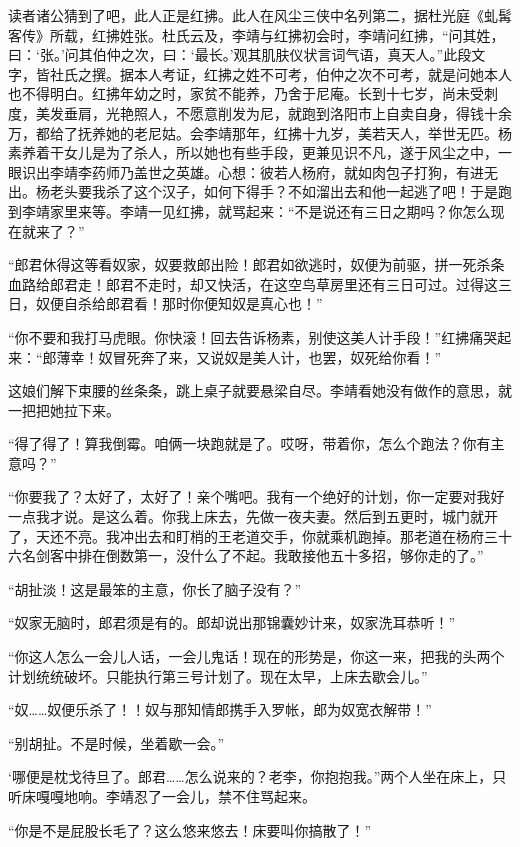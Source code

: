 读者诸公猜到了吧，此人正是红拂。此人在风尘三侠中名列第二，据杜光庭《虬髯客传》所载，红拂姓张。杜氏云及，李靖与红拂初会时，李靖问红拂，“问其姓，曰：‘张。’问其伯仲之次，曰：‘最长。’观其肌肤仪状言词气语，真天人。”此段文字，皆社氏之撰。据本人考证，红拂之姓不可考，伯仲之次不可考，就是问她本人也不得明白。红拂年幼之时，家贫不能养，乃舍于尼庵。长到十七岁，尚未受刺度，美发垂肩，光艳照人，不愿意削发为尼，就跑到洛阳市上自卖自身，得钱十余万，都给了抚养她的老尼姑。会李靖那年，红拂十九岁，美若天人，举世无匹。杨素养着干女儿是为了杀人，所以她也有些手段，更兼见识不凡，遂于风尘之中，一眼识出李靖李药师乃盖世之英雄。心想：彼若人杨府，就如肉包子打狗，有进无出。杨老头要我杀了这个汉子，如何下得手？不如溜出去和他一起逃了吧！于是跑到李靖家里来等。李靖一见红拂，就骂起来：“不是说还有三日之期吗？你怎么现在就来了？”

“郎君休得这等看奴家，奴要救郎出险！郎君如欲逃时，奴便为前驱，拼一死杀条血路给郎君走！郎君不走时，却又快活，在这空鸟草房里还有三日可过。过得这三日，奴便自杀给郎君看！那时你便知奴是真心也！”

“你不要和我打马虎眼。你快滚！回去告诉杨素，别使这美人计手段！”红拂痛哭起来：“郎薄幸！奴冒死奔了来，又说奴是美人计，也罢，奴死给你看！”

这娘们解下束腰的丝条条，跳上桌子就要悬梁自尽。李靖看她没有做作的意思，就一把把她拉下来。

“得了得了！算我倒霉。咱俩一块跑就是了。哎呀，带着你，怎么个跑法？你有主意吗？”

“你要我了？太好了，太好了！亲个嘴吧。我有一个绝好的计划，你一定要对我好一点我才说。是这么着。你我上床去，先做一夜夫妻。然后到五更时，城门就开了，天还不亮。我冲出去和盯梢的王老道交手，你就乘机跑掉。那老道在杨府三十六名剑客中排在倒数第一，没什么了不起。我敢接他五十多招，够你走的了。”

“胡扯淡！这是最笨的主意，你长了脑子没有？”

“奴家无脑时，郎君须是有的。郎却说出那锦囊妙计来，奴家洗耳恭听！”

“你这人怎么一会儿人话，一会儿鬼话！现在的形势是，你这一来，把我的头两个计划统统破坏。只能执行第三号计划了。现在太早，上床去歇会儿。”

“奴……奴便乐杀了！！奴与那知情郎携手入罗帐，郎为奴宽衣解带！”

“别胡扯。不是时候，坐着歇一会。”

‘哪便是枕戈待旦了。郎君……怎么说来的？老李，你抱抱我。”两个人坐在床上，只听床嘎嘎地响。李靖忍了一会儿，禁不住骂起来。

“你是不是屁股长毛了？这么悠来悠去！床要叫你搞散了！”

